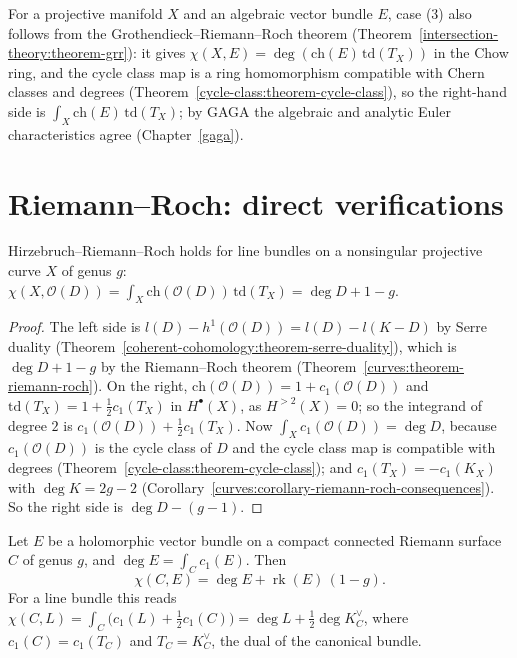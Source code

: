 \begin{remark}\label{index-theorems:remark-grr}
For a projective manifold $X$ and an algebraic vector bundle $E$, case (3) also follows from the Grothendieck--Riemann--Roch theorem (Theorem~\ref{intersection-theory:theorem-grr}): it gives
$\chi(X, E) = \deg(\mathrm{ch}(E)\,\mathrm{td}(T_X))$ in the Chow ring, and the cycle class map is a ring homomorphism compatible with Chern classes and degrees (Theorem~\ref{cycle-class:theorem-cycle-class}), so the right-hand
side is $\int_X\mathrm{ch}(E)\,\mathrm{td}(T_X)$; by GAGA the algebraic and analytic Euler characteristics agree (Chapter~\ref{gaga}).
\end{remark}

\section{Riemann--Roch: direct verifications}\label{index-theorems:section-verifications}

\begin{proposition}\label{index-theorems:proposition-rr-curves}
Hirzebruch--Riemann--Roch holds for line bundles on a nonsingular projective curve $X$ of genus $g$: $\chi(X, \mathcal{O}(D)) = \int_X\mathrm{ch}(\mathcal{O}(D))\,\mathrm{td}(T_X) = \deg D + 1 - g$.
\end{proposition}

\begin{proof}
The left side is $l(D) - h^1(\mathcal{O}(D)) = l(D) - l(K - D)$ by Serre duality (Theorem~\ref{coherent-cohomology:theorem-serre-duality}), which is $\deg D + 1 - g$ by the Riemann--Roch theorem
(Theorem~\ref{curves:theorem-riemann-roch}). On the right, $\mathrm{ch}(\mathcal{O}(D)) = 1 + c_1(\mathcal{O}(D))$ and $\mathrm{td}(T_X) = 1 + \frac12c_1(T_X)$ in $H^\bullet(X)$, as $H^{>2}(X) = 0$; so the integrand of degree $2$ is
$c_1(\mathcal{O}(D)) + \frac12c_1(T_X)$. Now $\int_Xc_1(\mathcal{O}(D)) = \deg D$, because $c_1(\mathcal{O}(D))$ is the cycle class of $D$ and the cycle class map is compatible with degrees
(Theorem~\ref{cycle-class:theorem-cycle-class}); and $c_1(T_X) = -c_1(K_X)$ with $\deg K = 2g - 2$ (Corollary~\ref{curves:corollary-riemann-roch-consequences}). So the right side is $\deg D - (g - 1)$.
\end{proof}

\begin{corollary}\label{index-theorems:corollary-rr-bundles-curves}
Let $E$ be a holomorphic vector bundle on a compact connected Riemann surface $C$ of genus $g$, and $\deg E = \int_Cc_1(E)$. Then
\[
\chi(C, E) = \deg E + \operatorname{rk}(E)\,(1 - g) .
\]
For a line bundle this reads $\chi(C, L) = \int_C\big(c_1(L) + \frac12c_1(C)\big) = \deg L + \frac12\deg K_C^\vee$, where $c_1(C) = c_1(T_C)$ and $T_C = K_C^\vee$, the dual of the canonical bundle.
\end{corollary}

